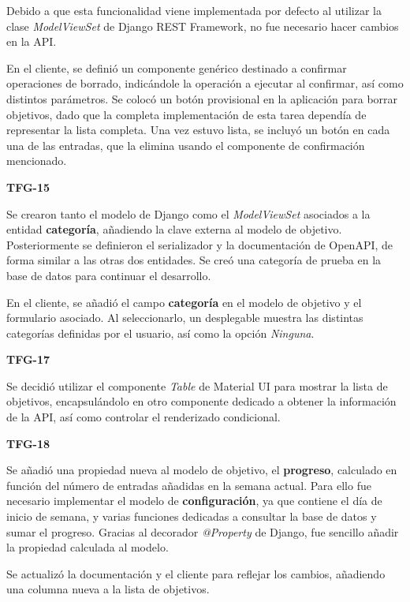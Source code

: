 \documentclass[10pt, a4paper]{aqademic}
\begin{document}
Debido a que esta funcionalidad viene implementada por defecto al utilizar la clase \textit{ModelViewSet} de Django REST Framework, no fue necesario hacer cambios en la API.

En el cliente, se definió un componente genérico destinado a confirmar operaciones de borrado, indicándole la operación a ejecutar al confirmar, así como distintos parámetros. Se colocó un botón provisional en la aplicación para borrar objetivos, dado que la completa implementación de esta tarea dependía de representar la lista completa. Una vez estuvo lista, se incluyó un botón en cada una de las entradas, que la elimina usando el componente de confirmación mencionado. 

\medskip

\textbf{TFG-15}

Se crearon tanto el modelo de Django como el \textit{ModelViewSet} asociados a la entidad \textbf{categoría}, añadiendo la clave externa al modelo de objetivo. Posteriormente se definieron el serializador y la documentación de OpenAPI, de forma similar a las otras dos entidades. Se creó una categoría de prueba en la base de datos para continuar el desarrollo.

En el cliente, se añadió el campo \textbf{categoría} en el modelo de objetivo y el formulario asociado. Al seleccionarlo, un desplegable muestra las distintas categorías definidas por el usuario, así como la opción \textit{Ninguna}. 

\medskip

\textbf{TFG-17}

Se decidió utilizar el componente \textit{Table} de Material UI para mostrar la lista de objetivos, encapsulándolo en otro componente dedicado a obtener la información de la API, así como controlar el renderizado condicional.

\medskip

\textbf{TFG-18}

Se añadió una propiedad nueva al modelo de objetivo, el \textbf{progreso}, calculado en función del número de entradas añadidas en la semana actual. Para ello fue necesario implementar el modelo de \textbf{configuración}, ya que contiene el día de inicio de semana, y varias funciones dedicadas a consultar la base de datos y sumar el progreso. Gracias al decorador \textit{@Property} de Django, fue sencillo añadir la propiedad calculada al modelo.

Se actualizó la documentación y el cliente para reflejar los cambios, añadiendo una columna nueva a la lista de objetivos.
\end{document}
